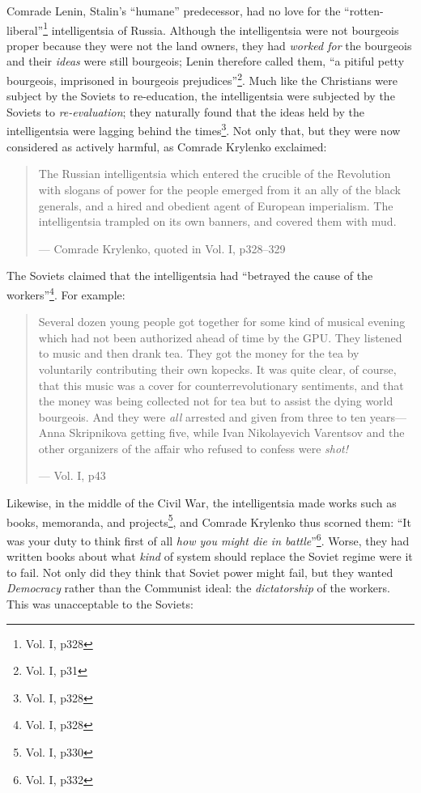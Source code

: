 \documentclass{article}
\begin{document}
Comrade Lenin, Stalin's ``humane'' predecessor, had no love for the ``rotten-liberal''\footnote{Vol. I, p328} intelligentsia of Russia.  Although the intelligentsia were not bourgeois proper because they were not the land owners, they had \emph{worked for} the bourgeois and their \emph{ideas} were still bourgeois; Lenin therefore called them, ``a pitiful petty bourgeois, imprisoned in bourgeois prejudices''\footnote{Vol. I, p31}.  Much like the Christians were subject by the Soviets to re-education, the intelligentsia were subjected by the Soviets to \emph{re-evaluation}; they naturally found that the ideas held by the intelligentsia were lagging behind the times\footnote{Vol. I, p328}.  Not only that, but they were now considered as actively harmful, as Comrade Krylenko exclaimed:

\begin{quote}
The Russian intelligentsia which entered the crucible of the Revolution with slogans of power for the people emerged from it an ally of the black generals, and a hired and obedient agent of European imperialism.  The intelligentsia trampled on its own banners, and covered them with mud.

--- Comrade Krylenko, quoted in Vol. I, p328--329
\end{quote}

The Soviets claimed that the intelligentsia had ``betrayed the cause of the workers''\footnote{Vol. I, p328}.  For example:

\begin{quote}
Several dozen young people got together for some kind of musical evening which had not been authorized ahead of time by the GPU.  They listened to music and then drank tea.  They got the money for the tea by voluntarily contributing their own kopecks.  It was quite clear, of course, that this music was a cover for counterrevolutionary sentiments, and that the money was being collected not for tea but to assist the dying world bourgeois.  And they were \emph{all} arrested and given from three to ten years---Anna Skripnikova getting five, while Ivan Nikolayevich Varentsov and the other organizers of the affair who refused to confess were \emph{shot!}

--- Vol. I, p43
\end{quote}

Likewise, in the middle of the Civil War, the intelligentsia made works such as books, memoranda, and projects\footnote{Vol. I, p330}, and Comrade Krylenko thus scorned them: ``It was your duty to think first of all \emph{how you might die in battle}''\footnote{Vol. I, p332}.  Worse, they had written books about what \emph{kind} of system should replace the Soviet regime were it to fail.  Not only did they think that Soviet power might fail, but they wanted \emph{Democracy} rather than the Communist ideal: the \emph{dictatorship} of the workers.  This was unacceptable to the Soviets:
\end{document}
